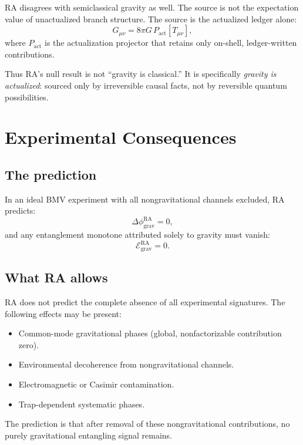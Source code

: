 \documentclass[12pt,a4paper]{article}
\newcommand{\Pact}{P_{\mathrm{act}}}
\begin{document}
RA disagrees with semiclassical gravity as well. The source is not
the expectation value of unactualized branch structure. The source
is the actualized ledger alone:
\begin{equation}
G_{\mu\nu} = 8\pi G\, \Pact[T_{\mu\nu}],
\end{equation}
where $\Pact$ is the actualization projector that retains only
on-shell, ledger-written contributions.

Thus RA's null result is not ``gravity is classical.'' It is
specifically \emph{gravity is actualized}: sourced only by irreversible
causal facts, not by reversible quantum possibilities.

\section{Experimental Consequences}
\label{sec:experiment}

\subsection{The prediction}

In an ideal BMV experiment with all nongravitational channels
excluded, RA predicts:
\begin{equation}
\Delta\phi_{\mathrm{grav}}^{\mathrm{RA}} = 0,
\end{equation}
and any entanglement monotone attributed solely to gravity must
vanish:
\begin{equation}
\mathcal{E}_{\mathrm{grav}}^{\mathrm{RA}} = 0.
\end{equation}

\subsection{What RA allows}

RA does not predict the complete absence of all experimental
signatures. The following effects may be present:
\begin{itemize}[nosep]
\item Common-mode gravitational phases (global, nonfactorizable
contribution zero).
\item Environmental decoherence from nongravitational channels.
\item Electromagnetic or Casimir contamination.
\item Trap-dependent systematic phases.
\end{itemize}
The prediction is that after removal of these nongravitational
contributions, no purely gravitational entangling signal remains.
\end{document}
